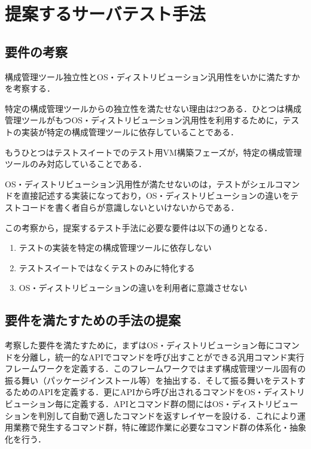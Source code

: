 \section{提案するサーバテスト手法}

\subsection{要件の考察}

構成管理ツール独立性とOS・ディストリビューション汎用性をいかに満たすかを考察する．

特定の構成管理ツールからの独立性を満たせない理由は2つある．ひとつは構成管理ツールがもつOS・ディストリビューション汎用性を利用するために，テストの実装が特定の構成管理ツールに依存していることである．

もうひとつはテストスイートでのテスト用VM構築フェーズが，特定の構成管理ツールのみ対応していることである．

OS・ディストリビューション汎用性が満たせないのは，テストがシェルコマンドを直接記述する実装になっており，OS・ディストリビューションの違いをテストコードを書く者自らが意識しないといけないからである．

この考察から，提案するテスト手法に必要な要件は以下の通りとなる．

\begin{enumerate}
  \item テストの実装を特定の構成管理ツールに依存しない
  \item テストスイートではなくテストのみに特化する
  \item OS・ディストリビューションの違いを利用者に意識させない
\end{enumerate}

\subsection{要件を満たすための手法の提案}

考察した要件を満たすために，まずはOS・ディストリビューション毎にコマンドを分離し，統一的なAPIでコマンドを呼び出すことができる汎用コマンド実行フレームワークを定義する．このフレームワークではまず構成管理ツール固有の振る舞い（パッケージインストール等）を抽出する．そして振る舞いをテストするためのAPIを定義する．更にAPIから呼び出されるコマンドをOS・ディストリビューション毎に定義する．APIとコマンド群の間にはOS・ディストリビューションを判別して自動で適したコマンドを返すレイヤーを設ける．これにより運用業務で発生するコマンド群，特に確認作業に必要なコマンド群の体系化・抽象化を行う．

